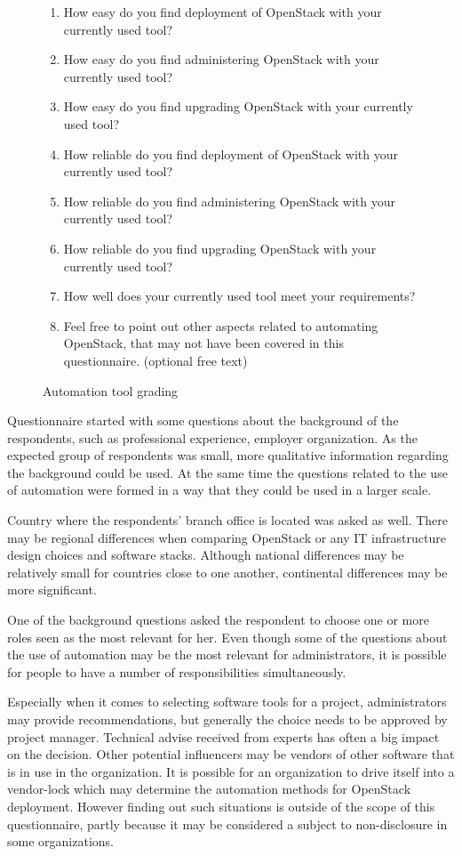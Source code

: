 \begin{figure}[t]
\begin{enumerate}
  \itemsep0em
  \item How easy do you find deployment of OpenStack with your currently used
        tool?
  \item How easy do you find administering OpenStack with your currently used
        tool?
  \item How easy do you find upgrading OpenStack with your currently used tool?
  \item How reliable do you find deployment of OpenStack with your currently
        used tool?
  \item How reliable do you find administering OpenStack with your currently
        used tool?
  \item How reliable do you find upgrading OpenStack with your currently used
        tool?
  \item How well does your currently used tool meet your requirements?
  \item Feel free to point out other aspects related to automating OpenStack,
        that may not have been covered in this questionnaire. (optional free
        text)
\end{enumerate}
\caption{Automation tool grading}
\label{fig:questionnaire-grading}
\end{figure}

Questionnaire started with some questions about the background of the
respondents, such as professional experience, employer organization. As the
expected group of respondents was small, more qualitative information regarding
the background could be used. At the same time the questions related to the use
of automation were formed in a way that they could be used in a larger scale.

Country where the respondents' branch office is located was asked as well.
There may be regional differences when comparing OpenStack or any IT
infrastructure design choices and software stacks. Although national
differences may be relatively small for countries close to one another,
continental differences may be more significant.

One of the background questions asked the respondent to choose one or more
roles seen as the most relevant for her. Even though some of the questions
about the use of automation may be the most relevant for administrators, it is
possible for people to have a number of responsibilities simultaneously.

Especially when it comes to selecting software tools for a project,
administrators may provide recommendations, but generally the choice needs to
be approved by project manager. Technical advise received from experts has
often a big impact on the decision. Other potential influencers may be vendors
of other software that is in use in the organization. It is possible for an
organization to drive itself into a vendor-lock which may determine the
automation methods for OpenStack deployment. However finding out such
situations is outside of the scope of this questionnaire, partly because it may
be considered a subject to non-disclosure in some organizations.

